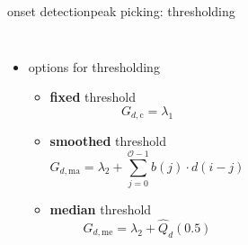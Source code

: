         \begin{frame}{onset detection}{peak picking: thresholding}
            \begin{columns}
            \begin{itemize}
                \item options for thresholding
                    \begin{itemize}
                        \item \textbf{fixed} threshold
                        \begin{equation*}
                            G_{d,\mathrm{c}} = \lambda_1 
                        \end{equation*}
                        \item<1->	\textbf{smoothed} threshold
                        \begin{equation*}
                            G_{d,\mathrm{ma}} = \lambda_2 + \sum\limits_{j=0}^{\mathcal{O}-1}{b(j)\cdot d(i-j)}
                        \end{equation*}
                        \item<1->	\textbf{median} threshold
                        \begin{equation*}
                            G_{d,\mathrm{me}} = \lambda_2 + \hat{Q}_d(0.5) 
                        \end{equation*}
                    \end{itemize}
            \end{itemize}
                    \vspace{-1mm}
            \end{columns}
        \end{frame}

